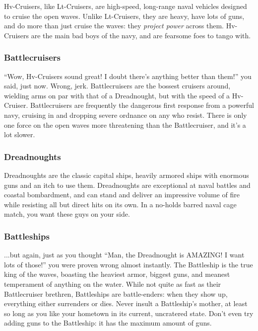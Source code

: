 \documentclass[11 pt]{scrartcl}
\begin{document}
Hv-Cruisers, like Lt-Cruisers, are high-speed, long-range naval vehicles designed to cruise the open waves. Unlike Lt-Cruisers, they are heavy, have lots of guns, and do more than just cruise the waves: they \textit{project power} across them. Hv-Cruisers are the main bad boys of the navy, and are fearsome foes to tango with.

\subsubsection*{Battlecruisers}

``Wow, Hv-Cruisers sound great! I doubt there's anything better than them!'' you said, just now. Wrong, jerk. Battlecruisers are the bossest cruisers around, wielding arms on par with that of a Dreadnought, but with the speed of a Hv-Cruiser. Battlecruisers are frequently the dangerous first response from a powerful navy, cruising in and dropping severe ordnance on any who resist. There is only one force on the open waves more threatening than the Battlecruiser, and it's a lot slower.

\subsubsection*{Dreadnoughts}

Dreadnoughts are the classic capital ships, heavily armored ships with enormous guns and an itch to use them. Dreadnoughts are exceptional at naval battles and coastal bombardment, and can stand and deliver an impressive volume of fire while resisting all but direct hits on its own. In a no-holds barred naval cage match, you want these guys on your side.

\subsubsection*{Battleships}

...but again, just as you thought ``Man, the Dreadnought is AMAZING! I want lots of those!'' you were proven wrong almost instantly. The Battleship is the true king of the waves, boasting the heaviest armor, biggest guns, and meanest temperament of anything on the water. While not quite as fast as their Battlecruiser brethren, Battleships are battle-enders: when they show up, everything either surrenders or dies. Never insult a Battleship's mother, at least so long as you like your hometown in its current, uncratered state. Don't even try adding guns to the Battleship: it has the maximum amount of guns.
\end{document}
